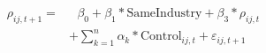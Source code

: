 \begin{equation*}
\begin{split}
\rho_{ij,t+1} = & \text{ 	}\beta_0 + \beta_1* \text{SameIndustry} +\beta_3* \rho_{ij,t}\\
& + \sum_{k=1} ^{n} \alpha_k*\text{Control}_{ij,t} + \varepsilon_{ij,t+1}
\end{split}
\end{equation*}